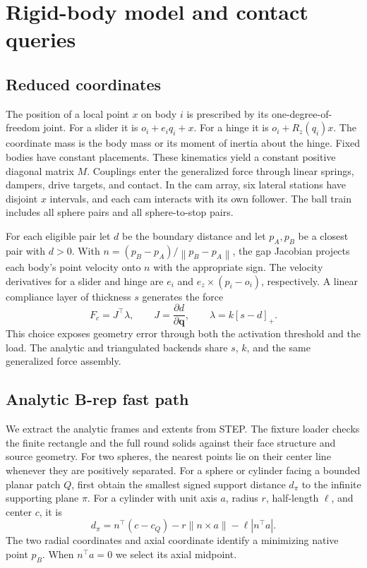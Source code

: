 \documentclass[10pt,a4paper]{article}
\newcommand{\norm}[1]{\left\lVert #1\right\rVert}
\newcommand{\q}{\mathbf q}
\begin{document}
\section{Rigid-body model and contact queries}

\subsection{Reduced coordinates}

The position of a local point \(x\) on body \(i\) is prescribed by its one-degree-of-freedom joint. For a slider it is \(o_i+e_i q_i+x\). For a hinge it is \(o_i+R_z(q_i)x\). The coordinate mass is the body mass or its moment of inertia about the hinge. Fixed bodies have constant placements. These kinematics yield a constant positive diagonal matrix \(M\). Couplings enter the generalized force through linear springs, dampers, drive targets, and contact. In the cam array, six lateral stations have disjoint \(x\) intervals, and each cam interacts with its own follower. The ball train includes all sphere pairs and all sphere-to-stop pairs.

For each eligible pair let \(d\) be the boundary distance and let \(p_A,p_B\) be a closest pair with \(d>0\). With \(n=(p_B-p_A)/\norm{p_B-p_A}\), the gap Jacobian projects each body's point velocity onto \(n\) with the appropriate sign. The velocity derivatives for a slider and hinge are \(e_i\) and \(e_z\times(p_i-o_i)\), respectively. A linear compliance layer of thickness \(s\) generates the force
\begin{equation}
    F_c=J^\top\lambda,\qquad
    J=\frac{\partial d}{\partial \q},\qquad
    \lambda=k[s-d]_+.
    \label{eq:compliance}
\end{equation}
This choice exposes geometry error through both the activation threshold and the load. The analytic and triangulated backends share \(s\), \(k\), and the same generalized force assembly.

\subsection{Analytic B-rep fast path}

We extract the analytic frames and extents from STEP. The fixture loader checks the finite rectangle and the full round solids against their face structure and source geometry. For two spheres, the nearest points lie on their center line whenever they are positively separated. For a sphere or cylinder facing a bounded planar patch \(Q\), first obtain the smallest signed support distance \(d_\pi\) to the infinite supporting plane \(\pi\). For a cylinder with unit axis \(a\), radius \(r\), half-length \(\ell\), and center \(c\), it is
\begin{equation}
d_\pi=n^\top(c-c_Q)-r\norm{n\times a}-\ell|n^\top a|.
\end{equation}
The two radial coordinates and axial coordinate identify a minimizing native point \(p_B\). When \(n^\top a=0\) we select its axial midpoint.
\end{document}
